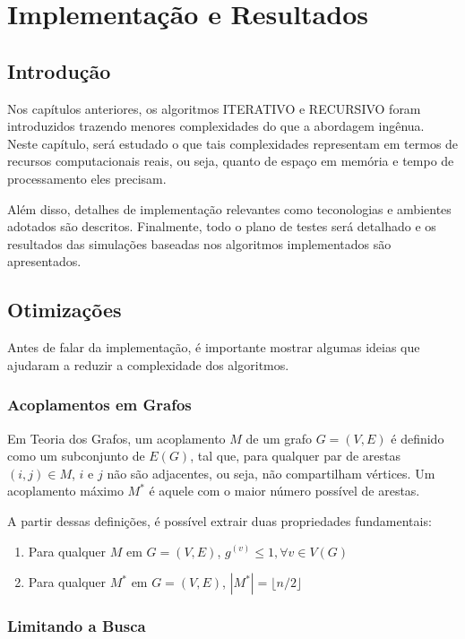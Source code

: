 \chapter{Implementação e Resultados}
\label{cap:resultados}

\section{Introdução}

Nos capítulos anteriores, os algoritmos ITERATIVO e RECURSIVO foram introduzidos trazendo menores complexidades do que a abordagem ingênua. Neste capítulo, será estudado o que tais complexidades representam em termos de recursos computacionais reais, ou seja, quanto de espaço em memória e tempo de processamento eles precisam. 

Além disso, detalhes de implementação relevantes como teconologias e ambientes adotados são descritos. Finalmente, todo o plano de testes será detalhado e os resultados das simulações baseadas nos algoritmos implementados são apresentados.

\section{Otimizações}

Antes de falar da implementação, é importante mostrar algumas ideias que ajudaram a reduzir a complexidade dos algoritmos.

\subsection{Acoplamentos em Grafos}

Em Teoria dos Grafos, um acoplamento $M$ de um grafo $G=(V,E)$ é definido como um subconjunto de $E(G)$, tal que, para qualquer par de arestas $(i,j) \in M$, $i$ e $j$ não são adjacentes, ou seja, não compartilham vértices. Um acoplamento máximo $M^*$ é aquele com o maior número possível de arestas. 

A partir dessas definições, é possível extrair duas propriedades fundamentais:
\begin{enumerate}
\item Para qualquer $M$ em $G=(V,E)$, $g^(v) \leq 1, \forall v \in V(G)$
\item Para qualquer $M^*$ em $G=(V,E)$, $|M^*|= \lfloor n/2 \rfloor$
\end{enumerate}

\subsection{Limitando a Busca}

